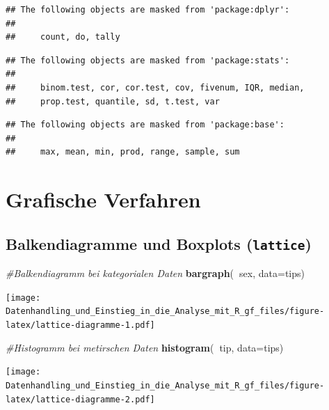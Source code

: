 \documentclass[10pt,ngerman,onside]{article}
\newenvironment{Shaded}{\begin{snugshade}}{\end{snugshade}}
\newcommand{\KeywordTok}[1]{\textcolor[rgb]{0.13,0.29,0.53}{\textbf{#1}}}
\newcommand{\DataTypeTok}[1]{\textcolor[rgb]{0.13,0.29,0.53}{#1}}
\newcommand{\CommentTok}[1]{\textcolor[rgb]{0.56,0.35,0.01}{\textit{#1}}}
\newcommand{\OperatorTok}[1]{\textcolor[rgb]{0.81,0.36,0.00}{\textbf{#1}}}
\newcommand{\NormalTok}[1]{#1}
\begin{document}
\begin{verbatim}
## The following objects are masked from 'package:dplyr':
## 
##     count, do, tally
\end{verbatim}

\begin{verbatim}
## The following objects are masked from 'package:stats':
## 
##     binom.test, cor, cor.test, cov, fivenum, IQR, median,
##     prop.test, quantile, sd, t.test, var
\end{verbatim}

\begin{verbatim}
## The following objects are masked from 'package:base':
## 
##     max, mean, min, prod, range, sample, sum
\end{verbatim}

\hypertarget{grafische-verfahren}{%
\section{Grafische Verfahren}\label{grafische-verfahren}}

\hypertarget{balkendiagramme-und-boxplots-lattice}{%
\subsection{\texorpdfstring{Balkendiagramme und Boxplots
(\texttt{lattice})}{Balkendiagramme und Boxplots (lattice)}}\label{balkendiagramme-und-boxplots-lattice}}

\begin{Shaded}
\begin{Highlighting}[]
\CommentTok{#Balkendiagramm bei kategorialen Daten}
\KeywordTok{bargraph}\NormalTok{(}\OperatorTok{~}\NormalTok{sex, }\DataTypeTok{data=}\NormalTok{tips)}
\end{Highlighting}
\end{Shaded}

\texttt{[image: Datenhandling\_und\_Einstieg\_in\_die\_Analyse\_mit\_R\_gf\_files/figure-latex/lattice-diagramme-1.pdf]}

\begin{Shaded}
\begin{Highlighting}[]
\CommentTok{#Histogramm bei metirschen Daten}
\KeywordTok{histogram}\NormalTok{(}\OperatorTok{~}\NormalTok{tip, }\DataTypeTok{data=}\NormalTok{tips)}
\end{Highlighting}
\end{Shaded}

\texttt{[image: Datenhandling\_und\_Einstieg\_in\_die\_Analyse\_mit\_R\_gf\_files/figure-latex/lattice-diagramme-2.pdf]}
\end{document}
